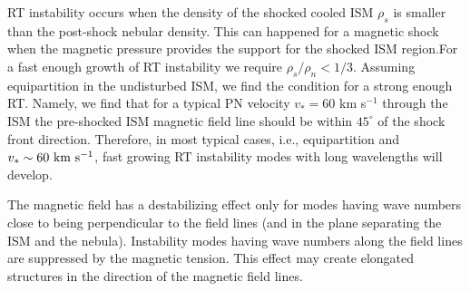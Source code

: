 RT instability occurs when the density of the shocked cooled ISM
$\rho_s$ is smaller
than the post-shock nebular density.
This can happened for a magnetic shock when the magnetic pressure
 provides the support for the shocked ISM region.For a fast enough growth of
RT instability we require $\rho_s/\rho_n < 1/3$.
Assuming equipartition  in the
undisturbed ISM, we find the condition for a strong enough RT.
Namely, we  find that for a typical PN velocity $v_\ast=60$  km s$^{-1}$
 through the ISM the pre-shocked ISM
magnetic field line should be within $45^\circ$ of the shock front direction.
 Therefore, in most typical cases, i.e., equipartition and
$v_\ast \sim 60 ~\rm{km} ~\rm{s}^{-1}$, fast growing RT instability modes with long
wavelengths will develop.

The magnetic field has a destabilizing effect only for modes
having wave numbers close to being perpendicular to the field lines
(and in the plane separating the ISM and the nebula).
Instability modes having wave numbers along the field lines are
suppressed by the magnetic tension.
This effect may create elongated structures in the direction of the
magnetic field lines.

